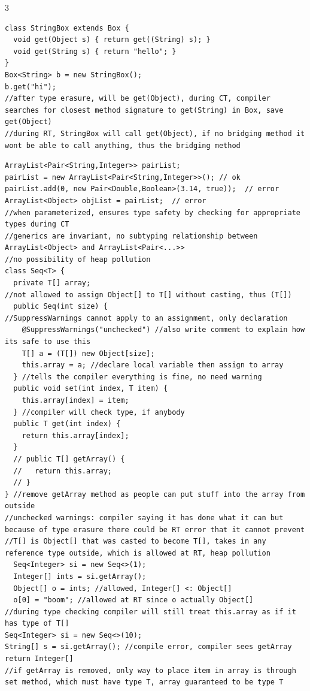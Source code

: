 \documentclass[10pt,a4paper]{article}
\begin{document}
\begin{multicols*}{3}
\begin{verbatim}
class StringBox extends Box {
  void get(Object s) { return get((String) s); }
  void get(String s) { return "hello"; }
}
Box<String> b = new StringBox();
b.get("hi");
//after type erasure, will be get(Object), during CT, compiler searches for closest method signature to get(String) in Box, save get(Object)
//during RT, StringBox will call get(Object), if no bridging method it wont be able to call anything, thus the bridging method
\end{verbatim}
\begin{verbatim}
ArrayList<Pair<String,Integer>> pairList;
pairList = new ArrayList<Pair<String,Integer>>(); // ok
pairList.add(0, new Pair<Double,Boolean>(3.14, true));  // error
ArrayList<Object> objList = pairList;  // error
//when parameterized, ensures type safety by checking for appropriate types during CT
//generics are invariant, no subtyping relationship between ArrayList<Object> and ArrayList<Pair<...>>
//no possibility of heap pollution
class Seq<T> {
  private T[] array;
//not allowed to assign Object[] to T[] without casting, thus (T[])
  public Seq(int size) {
//SuppressWarnings cannot apply to an assignment, only declaration
    @SuppressWarnings("unchecked") //also write comment to explain how its safe to use this
    T[] a = (T[]) new Object[size];
    this.array = a; //declare local variable then assign to array
  } //tells the compiler everything is fine, no need warning
  public void set(int index, T item) {
    this.array[index] = item;
  } //compiler will check type, if anybody
  public T get(int index) {
    return this.array[index];
  }
  // public T[] getArray() {
  //   return this.array;
  // }
} //remove getArray method as people can put stuff into the array from outside
//unchecked warnings: compiler saying it has done what it can but because of type erasure there could be RT error that it cannot prevent
//T[] is Object[] that was casted to become T[], takes in any reference type outside, which is allowed at RT, heap pollution
  Seq<Integer> si = new Seq<>(1);
  Integer[] ints = si.getArray();
  Object[] o = ints; //allowed, Integer[] <: Object[]
  o[0] = "boom"; //allowed at RT since o actually Object[]
//during type checking compiler will still treat this.array as if it has type of T[]
Seq<Integer> si = new Seq<>(10);
String[] s = si.getArray(); //compile error, compiler sees getArray return Integer[]
//if getArray is removed, only way to place item in array is through set method, which must have type T, array guaranteed to be type T

\end{verbatim}
\end{multicols*}
\end{document}
